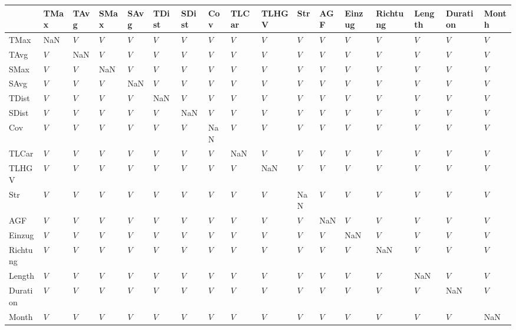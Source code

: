 \begin{tabular}{lllllllllllllllll}
\toprule
{} & TMax & TAvg & SMax & SAvg & TDist & SDist &  Cov & TLCar & TLHGV &  Str &  AGF & Einzug & Richtung & Length & Duration & Month \\
\midrule
TMax     &  NaN &  $V$ &  $V$ &  $V$ &   $V$ &   $V$ &  $V$ &   $V$ &   $V$ &  $V$ &  $V$ &    $V$ &      $V$ &    $V$ &      $V$ &   $V$ \\
TAvg     &  $V$ &  NaN &  $V$ &  $V$ &   $V$ &   $V$ &  $V$ &   $V$ &   $V$ &  $V$ &  $V$ &    $V$ &      $V$ &    $V$ &      $V$ &   $V$ \\
SMax     &  $V$ &  $V$ &  NaN &  $V$ &   $V$ &   $V$ &  $V$ &   $V$ &   $V$ &  $V$ &  $V$ &    $V$ &      $V$ &    $V$ &      $V$ &   $V$ \\
SAvg     &  $V$ &  $V$ &  $V$ &  NaN &   $V$ &   $V$ &  $V$ &   $V$ &   $V$ &  $V$ &  $V$ &    $V$ &      $V$ &    $V$ &      $V$ &   $V$ \\
TDist    &  $V$ &  $V$ &  $V$ &  $V$ &   NaN &   $V$ &  $V$ &   $V$ &   $V$ &  $V$ &  $V$ &    $V$ &      $V$ &    $V$ &      $V$ &   $V$ \\
SDist    &  $V$ &  $V$ &  $V$ &  $V$ &   $V$ &   NaN &  $V$ &   $V$ &   $V$ &  $V$ &  $V$ &    $V$ &      $V$ &    $V$ &      $V$ &   $V$ \\
Cov      &  $V$ &  $V$ &  $V$ &  $V$ &   $V$ &   $V$ &  NaN &   $V$ &   $V$ &  $V$ &  $V$ &    $V$ &      $V$ &    $V$ &      $V$ &   $V$ \\
TLCar    &  $V$ &  $V$ &  $V$ &  $V$ &   $V$ &   $V$ &  $V$ &   NaN &   $V$ &  $V$ &  $V$ &    $V$ &      $V$ &    $V$ &      $V$ &   $V$ \\
TLHGV    &  $V$ &  $V$ &  $V$ &  $V$ &   $V$ &   $V$ &  $V$ &   $V$ &   NaN &  $V$ &  $V$ &    $V$ &      $V$ &    $V$ &      $V$ &   $V$ \\
Str      &  $V$ &  $V$ &  $V$ &  $V$ &   $V$ &   $V$ &  $V$ &   $V$ &   $V$ &  NaN &  $V$ &    $V$ &      $V$ &    $V$ &      $V$ &   $V$ \\
AGF      &  $V$ &  $V$ &  $V$ &  $V$ &   $V$ &   $V$ &  $V$ &   $V$ &   $V$ &  $V$ &  NaN &    $V$ &      $V$ &    $V$ &      $V$ &   $V$ \\
Einzug   &  $V$ &  $V$ &  $V$ &  $V$ &   $V$ &   $V$ &  $V$ &   $V$ &   $V$ &  $V$ &  $V$ &    NaN &      $V$ &    $V$ &      $V$ &   $V$ \\
Richtung &  $V$ &  $V$ &  $V$ &  $V$ &   $V$ &   $V$ &  $V$ &   $V$ &   $V$ &  $V$ &  $V$ &    $V$ &      NaN &    $V$ &      $V$ &   $V$ \\
Length   &  $V$ &  $V$ &  $V$ &  $V$ &   $V$ &   $V$ &  $V$ &   $V$ &   $V$ &  $V$ &  $V$ &    $V$ &      $V$ &    NaN &      $V$ &   $V$ \\
Duration &  $V$ &  $V$ &  $V$ &  $V$ &   $V$ &   $V$ &  $V$ &   $V$ &   $V$ &  $V$ &  $V$ &    $V$ &      $V$ &    $V$ &      NaN &   $V$ \\
Month    &  $V$ &  $V$ &  $V$ &  $V$ &   $V$ &   $V$ &  $V$ &   $V$ &   $V$ &  $V$ &  $V$ &    $V$ &      $V$ &    $V$ &      $V$ &   NaN \\
\bottomrule
\end{tabular}
